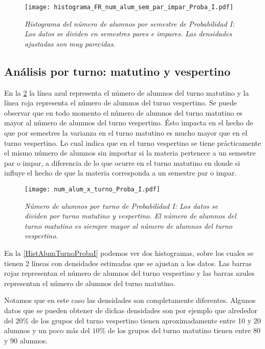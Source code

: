 \begin{figure}[h]
\centering
\texttt{[image: histograma\_FR\_num\_alum\_sem\_par\_impar\_Proba\_I.pdf]} %
\caption[\textit{Histograma del número de alumnos por semestre: Probabilidad I}]{\textit{Histograma del número de alumnos por semestre  de Probabilidad I: Los datos se dividen en semestres pares e impares. Las densidades ajustadas son muy parecidas.}}\label{HistAlumParImparProbaI}
\end{figure}

\subsection{Análisis por turno: matutino y vespertino}

En la \figurename{\ref{num_alum_x_turno_Proba_I}} la línea azul representa el número de alumnos del turno matutino y la línea roja representa el número de alumnos del turno vespertino. Se puede observar que en todo momento el número de alumnos del turno matutino es mayor al número de alumnos del turno vespertino. Ésto impacta en el hecho de que por semestres la varianza en el turno matutino es mucho mayor que en el turno vespertino. Lo cual indica que en el turno vespertino se tiene prácticamente el mismo número de alumnos sin importar si la materia pertenece a un semestre par o impar, a diferencia de lo que ocurre en el turno matutino en donde si influye el hecho de que la materia corresponda a un semestre par o impar.


\begin{figure}[h]
\centering
\texttt{[image: num\_alum\_x\_turno\_Proba\_I.pdf]} %
\caption[\textit{Número de alumnos por turno: Probabilidad I}]{\textit{Número de alumnos por turno de Probabilidad I: Los datos se dividen por turno matutino y vespertino. El número de alumnos del turno matutino es siempre mayor al número de alumnos del turno vespertino.}}\label{num_alum_x_turno_Proba_I}
\end{figure}

En la \figurename{\ref{HistAlumTurnoProbaI}} podemos ver dos histogramas, sobre los cuales se tienen 2 líneas con  densidades estimadas que se ajustan a los datos. Las barras rojas representan el número de alumnos del turno vespertino y las barras azules representan el número de alumnos del turno matutino.

Notamos que en este caso las densidades son completamente diferentes. Algunos datos que se pueden obtener de dichas densidades son por ejemplo que alrededor del $20\%$ de los grupos del turno vespertino tienen aproximadamente entre 10 y 20 alumnos y un poco más del $10\%$ de los grupos del turno matutino tienen entre 80 y 90 alumnos.

